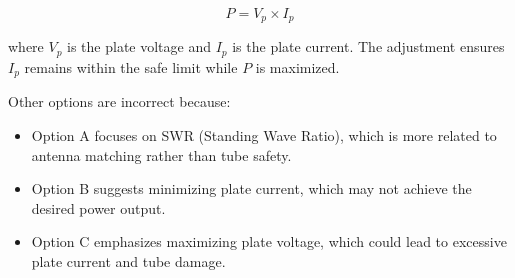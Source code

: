 \[
P = V_p \times I_p
\]

where \( V_p \) is the plate voltage and \( I_p \) is the plate current. The adjustment ensures \( I_p \) remains within the safe limit while \( P \) is maximized.

Other options are incorrect because:
\begin{itemize}
    \item Option A focuses on SWR (Standing Wave Ratio), which is more related to antenna matching rather than tube safety.
    \item Option B suggests minimizing plate current, which may not achieve the desired power output.
    \item Option C emphasizes maximizing plate voltage, which could lead to excessive plate current and tube damage.
\end{itemize}

